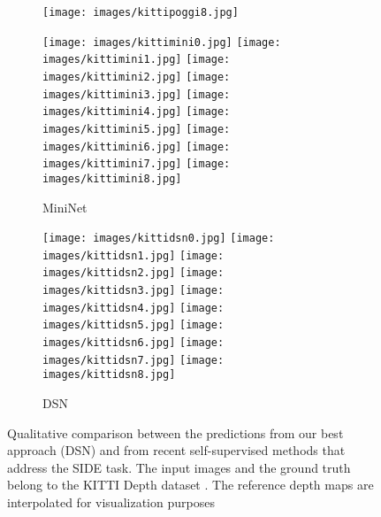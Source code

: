 \documentclass[5p]{elsarticle}
\begin{document}
\begin{figure*}[t!]
\begin{subfigure}[t]{0.16\textwidth}
         \texttt{[image: images/kittipoggi8.jpg]}
         \label{kittisubfig0:poggi}
     \end{subfigure}
         \begin{subfigure}[t]{0.16\textwidth}
         \centering
         \caption{MiniNet \cite{liu2020mininet}}
         \texttt{[image: images/kittimini0.jpg]}
         \hspace{1em}
         \texttt{[image: images/kittimini1.jpg]}
         \hspace{1em}
         \texttt{[image: images/kittimini2.jpg]}
         \hspace{1em}
         \texttt{[image: images/kittimini3.jpg]}
         \hspace{1em}
         \texttt{[image: images/kittimini4.jpg]}
         \hspace{1em}
         \texttt{[image: images/kittimini5.jpg]}
         \hspace{1em}
         \texttt{[image: images/kittimini6.jpg]}
         \hspace{1em}
         \texttt{[image: images/kittimini7.jpg]}
         \hspace{1em}
         \texttt{[image: images/kittimini8.jpg]}
         \label{kittisubfig0:mininet}
     \end{subfigure}
     \begin{subfigure}[t]{0.16\textwidth}
         \centering
         \caption{DSN}
         \texttt{[image: images/kittidsn0.jpg]}
         \hspace{1em}
         \texttt{[image: images/kittidsn1.jpg]}
         \hspace{1em}
         \texttt{[image: images/kittidsn2.jpg]}
         \hspace{1em}
         \texttt{[image: images/kittidsn3.jpg]}
         \hspace{1em}
         \texttt{[image: images/kittidsn4.jpg]}
         \hspace{1em}
         \texttt{[image: images/kittidsn5.jpg]}
         \hspace{1em}
         \texttt{[image: images/kittidsn6.jpg]}
         \hspace{1em}
         \texttt{[image: images/kittidsn7.jpg]}
         \hspace{1em}
         \texttt{[image: images/kittidsn8.jpg]}
         \label{kittisubfig0:DSN}
     \end{subfigure}
     \caption{Qualitative comparison between the predictions from our best approach (DSN) and from recent self-supervised methods that address the SIDE task. The input images and the ground truth belong to the KITTI Depth dataset \cite{uhrig2017sparsity}. The reference depth maps are interpolated for visualization purposes} 
     \label{kittisubfig0:all}
\end{figure*}
\end{document}
